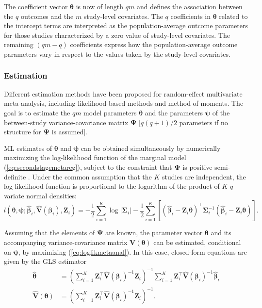 The coefficient vector $\boldsymbol{\theta}$ is now of length $qm$ and defines the association between the $q$ outcomes and the $m$ study-level covariates. The $q$ coefficients in $\boldsymbol{\theta}$ related to the intercept terms are interpreted as the population-average outcome parameters for those studies characterized by a zero value of study-level covariates. The remaining $(qm-q)$ coefficients express how the population-average outcome parameters vary in respect to the values taken by the study-level covariates.

\subsubsection{Estimation}
Different estimation methods have been proposed for random-effect multivariate meta-analysis, including likelihood-based methods and method of moments. The goal is to estimate the $qm$ model parameters $\boldsymbol{\theta}$ and the  parameters  $\boldsymbol{\psi}$ of the between-study variance-covariance matrix $\boldsymbol{\Psi}$ [$q(q+1)/2$ parameters if no structure for $\boldsymbol{\Psi}$ is assumed]. 

ML estimates of $\boldsymbol{\theta}$ and $\boldsymbol{\psi}$ can be obtained simultaneously by numerically maximizing the log-likelihood function of the marginal model (\ref{eq:secondstagemetareg}), subject to the constraint that $\boldsymbol{\Psi}$ is positive semi-definite \citep{white_multivariate_2011}. Under the common assumption that the $K$ studies are independent, the log-likelihood function is proportional to the logarithm of the product of $K$ $q$-variate normal densities:
\begin{equation} 
l(\boldsymbol{\theta}, \boldsymbol{\psi};\hat{\boldsymbol{\beta}}_i,\hat{\mathbf{V}}(\boldsymbol{\beta}_i),\mathbf{Z}_i) = -\frac{1}{2} \sum_{i=1}^K \log | \boldsymbol{\Sigma}_i | - \frac{1}{2} \sum_{i=1}^K \left[ \left(\hat{\boldsymbol{\beta}}_i - \mathbf{Z}_i \boldsymbol{\theta} \right)^\top \boldsymbol{\Sigma}_i^{-1} \left(\hat{\boldsymbol{\beta}}_i - \mathbf{Z}_i \boldsymbol{\theta} \right) \right]. 
\label{eq:loglikmetaanal}
\end{equation}

Assuming that the elements of $\boldsymbol{\Psi}$ are known, the parameter vector $\boldsymbol{\theta}$ and its accompanying variance-covariance matrix $\mathbf{V}(\boldsymbol{\theta})$ can be estimated, conditional on $\boldsymbol{\psi}$, by maximizing (\ref{eq:loglikmetaanal}). In this case, closed-form equations are given by the GLS estimator
\begin{align}
\hat{\boldsymbol{\theta}} &= \left( \sum_{i=1}^{K} \mathbf{Z}_i^\top \hat{\mathbf{V}}(\boldsymbol{\beta}_i)^{-1} \mathbf{Z}_i \right)^{-1} \sum_{i=1}^{K} \mathbf{Z}_i^\top \hat{\mathbf{V}}(\boldsymbol{\beta}_i)^{-1} \hat{\boldsymbol{\beta}}_i  \label{eq:gls} \\
\hat{\mathbf{V}}(\boldsymbol{\theta}) &=  \left( \sum_{i=1}^{K} \mathbf{Z}_i^\top \hat{\mathbf{V}}(\boldsymbol{\beta}_i)^{-1} \mathbf{Z}_i \right)^{-1}. \label{eq:glsv}
\end{align}

